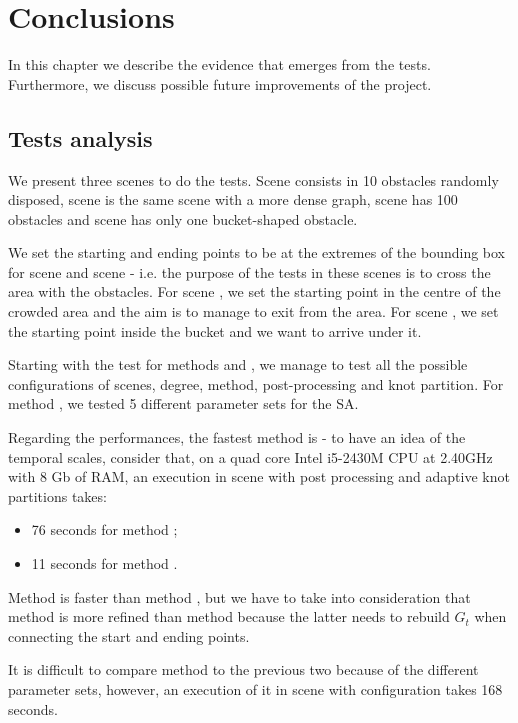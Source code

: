 \documentclass[dissertation.tex]{subfiles}
\begin{document}
\chapter{Conclusions}\label{cha:conclusions}
In this chapter we describe the evidence that emerges from the tests.
Furthermore, we discuss possible future improvements of the project.

\section{Tests analysis}
We present three scenes to do the tests. Scene \sceneA consists
in 10 obstacles randomly disposed, scene \sceneAb is the same scene
with a more dense graph, scene \sceneB has 100 obstacles and scene
\sceneC has 
only one bucket-shaped obstacle. 

We set the starting and ending points
to be at the extremes of the bounding box for scene \sceneA and scene
\sceneAb - 
i.e. the purpose of the tests in these scenes is to cross the area
with the obstacles. For scene \sceneB, we set the starting point in the
centre of the crowded area and the aim is to manage to exit
from the area. For scene \sceneC, we set the starting point inside the bucket
and we want to arrive under it.

Starting with the test for methods \metA and \metB, we manage to test
all the possible configurations of scenes, degree, method,
post-processing and knot partition. For method \metC, we tested 5
different 
parameter sets for the \acf{SA}.

Regarding the performances, the fastest method is \metB - to have an
idea of the temporal scales, consider that, on a quad core Intel
i5-2430M CPU at 2.40GHz with 8 Gb of RAM, an execution in scene
\sceneA with post processing and adaptive knot partitions takes:
\begin{itemize}
\item 76 seconds for method \metA;
\item 11 seconds for method \metB.
\end{itemize}
Method \metB is faster than method \metA, but we have to take into
consideration that method \metB is more refined than method \metA
because the 
latter needs to rebuild $G_t$ when connecting the start and ending points.

It is difficult to compare method \metC to the previous two because
of the different
parameter sets, however, an execution of it in scene \sceneA with
configuration \annA takes 168 seconds.
\end{document}
